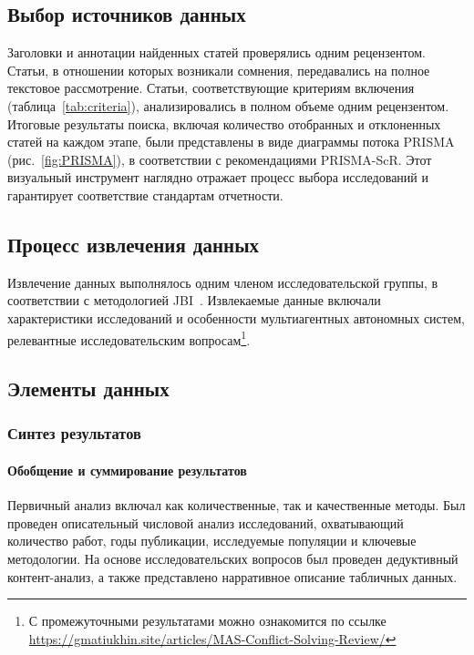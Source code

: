 \documentclass[%
]{ittmm}
\begin{document}
\subsection{Выбор источников данных}

Заголовки и аннотации найденных статей проверялись одним рецензентом.
Статьи, в отношении которых возникали сомнения, передавались
на полное текстовое рассмотрение. Статьи, соответствующие
критериям включения (таблица~\ref{tab:criteria}), анализировались в полном объеме
одним рецензентом. Итоговые результаты поиска, включая количество
отобранных и отклоненных статей на каждом этапе, были представлены
в виде диаграммы потока PRISMA (рис.~\ref{fig:PRISMA}), в соответствии с рекомендациями PRISMA-ScR.
Этот визуальный инструмент наглядно отражает процесс выбора исследований
и гарантирует соответствие стандартам отчетности.

\subsection{Процесс извлечения данных}

Извлечение данных выполнялось одним членом исследовательской группы,
в соответствии с методологией JBI~\cite{afc61c6cf471416489e36a4bc382d3b9}.
Извлекаемые данные включали характеристики исследований и особенности
мультиагентных автономных систем, релевантные исследовательским вопросам\footnote{С промежуточными результатами можно ознакомится по ссылке
\url{https://gmatiukhin.site/articles/MAS-Conflict-Solving-Review/}}.

\subsection{Элементы данных}

\subsubsection{Синтез результатов}

\paragraph{Обобщение и суммирование результатов}

Первичный анализ включал как количественные, так и качественные методы.
Был проведен описательный числовой анализ исследований, охватывающий
количество работ, годы публикации, исследуемые популяции и ключевые методологии.
На основе исследовательских вопросов был проведен дедуктивный контент-анализ,
а также представлено нарративное описание табличных данных.
\end{document}
